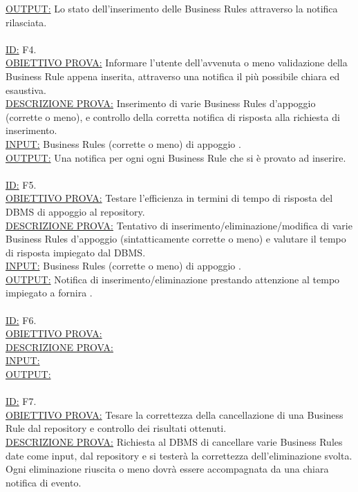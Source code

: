 \documentclass[11pt,titlepage,a4paper]{report}
\begin{document}
\underline{OUTPUT:} Lo stato dell'inserimento delle Business Rules attraverso la notifica rilasciata.\\
\\
\underline{ID:} F4.\\
\underline{OBIETTIVO PROVA:} Informare l'utente dell'avvenuta o meno validazione della Business Rule appena inserita, attraverso una notifica il pi\`u possibile chiara ed esaustiva. \\
\underline{DESCRIZIONE PROVA:} Inserimento di varie Business Rules d'appoggio (corrette o meno), e controllo della corretta notifica di risposta alla richiesta di inserimento.\\
\underline{INPUT:} Business Rules (corrette o meno) di appoggio .\\
\underline{OUTPUT:} Una notifica per ogni ogni Business Rule che si \`e provato ad inserire.\\
\\
\underline{ID:} F5.\\
\underline{OBIETTIVO PROVA:} Testare l'efficienza in termini di tempo di risposta del DBMS di appoggio al repository. \\
\underline{DESCRIZIONE PROVA:} Tentativo di inserimento/eliminazione/modifica di varie Business Rules d'appoggio (sintatticamente corrette o meno) e valutare il tempo di risposta impiegato dal DBMS.\\
\underline{INPUT:} Business Rules (corrette o meno) di appoggio .\\
\underline{OUTPUT:} Notifica di inserimento/eliminazione prestando attenzione al tempo impiegato a fornira .\\
\\
\underline{ID:} F6.\\
\underline{OBIETTIVO PROVA:}  \\
\underline{DESCRIZIONE PROVA:} \\
\underline{INPUT:} \\
\underline{OUTPUT:} \\
\\
\underline{ID:} F7.\\
\underline{OBIETTIVO PROVA:} Tesare la correttezza della cancellazione di una Business Rule dal repository e controllo dei risultati ottenuti. \\
\underline{DESCRIZIONE PROVA:} Richiesta al DBMS di cancellare varie Business Rules date come input, dal repository e si tester\`a la correttezza dell'eliminazione svolta. Ogni eliminazione riuscita o meno dovr\`a essere accompagnata da una chiara notifica di evento.\\
\end{document}
